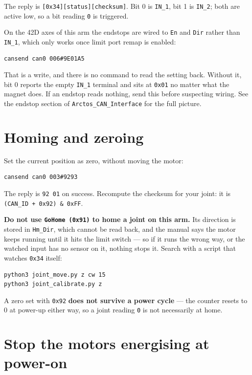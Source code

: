 \documentclass[11pt,letterpaper]{article}
\begin{document}
The reply is \texttt{[0x34][status][checksum]}. Bit 0 is \texttt{IN\_1}, bit 1 is
\texttt{IN\_2}; both are active low, so a bit reading \texttt{0} is triggered.

On the 42D axes of this arm the endstops are wired to \texttt{En} and \texttt{Dir}
rather than \texttt{IN\_1}, which only works once limit port remap is enabled:

\begin{lstlisting}
cansend can0 006#9E01A5
\end{lstlisting}

That is a write, and there is no command to read the setting back. Without it, bit 0
reports the empty \texttt{IN\_1} terminal and sits at \texttt{0x01} no matter what
the magnet does. If an endstop reads nothing, send this before suspecting wiring.
See the endstop section of \texttt{Arctos\_CAN\_Interface} for the full picture.

\section{Homing and zeroing}

Set the current position as zero, without moving the motor:

\begin{lstlisting}
cansend can0 003#9293
\end{lstlisting}

The reply is \texttt{92 01} on success. Recompute the checksum for your joint:
it is \texttt{(CAN\_ID + 0x92) \& 0xFF}.

\textbf{Do not use \texttt{GoHome (0x91)} to home a joint on this arm.} Its
direction is stored in \texttt{Hm\_Dir}, which cannot be read back, and the
manual says the motor keeps running until it hits the limit switch --- so if it
runs the wrong way, or the watched input has no sensor on it, nothing stops it.
Search with a script that watches \texttt{0x34} itself:

\begin{lstlisting}
python3 joint_move.py z cw 15
python3 joint_calibrate.py z
\end{lstlisting}

A zero set with \texttt{0x92} \textbf{does not survive a power cycle} --- the
counter resets to 0 at power-up either way, so a joint reading \texttt{0} is not
necessarily at home.

\section{Stop the motors energising at power-on}
\end{document}
